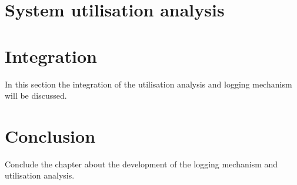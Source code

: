 \section{System utilisation analysis}

\section{Integration}
In this section the integration of the utilisation analysis and logging mechanism will be discussed.

\section{Conclusion}
Conclude the chapter about the development of the logging mechanism and utilisation analysis.